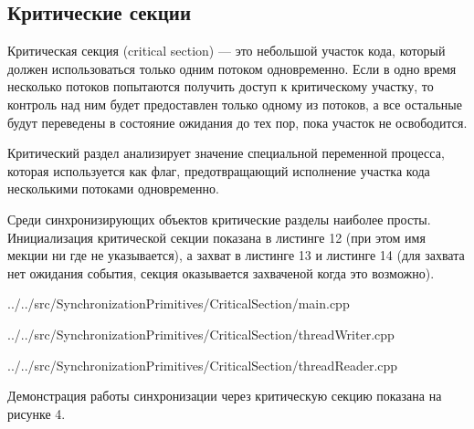 \documentclass[a4paper, 12pt]{article}		%
\begin{document}

\newpage





\newpage
\subsection{Критические секции}

Критическая секция (critical section) — это небольшой участок кода, который должен использоваться только одним потоком одновременно. Если в одно время несколько потоков попытаются получить доступ к критическому участку, то контроль над ним будет предоставлен только одному из потоков, а все остальные будут переведены в состояние ожидания до тех пор, пока участок не освободится.

Критический раздел анализирует значение специальной переменной процесса, которая используется как флаг, предотвращающий исполнение участка кода несколькими потоками одновременно.

Среди синхронизирующих объектов критические разделы наиболее просты. Инициализация критической секции показана в листинге 12 (при этом имя мекции ни где не указывается), а захват в листинге 13 и листинге 14 (для захвата нет ожидания события, секция оказывается захваченой когда это возможно).


{../../src/SynchronizationPrimitives/CriticalSection/main.cpp}


{../../src/SynchronizationPrimitives/CriticalSection/threadWriter.cpp}

\newpage

{../../src/SynchronizationPrimitives/CriticalSection/threadReader.cpp}

Демонстрация работы синхронизации через критическую секцию показана на рисунке 4.
\end{document}
